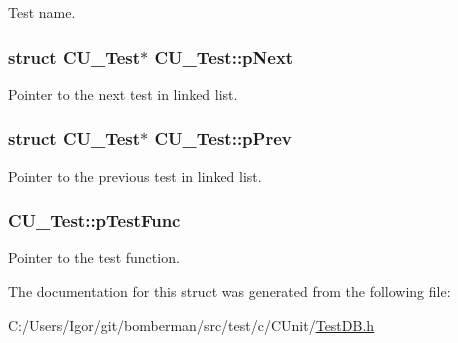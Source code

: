 Test name. 

\hypertarget{struct_c_u___test_abca70319a9ee946094bd7de3e3207141}{
\subsubsection[{p\+Next}]{\setlength{\rightskip}{0pt plus 5cm}struct {\bf C\+U\+\_\+\+Test}$\ast$ C\+U\+\_\+\+Test\+::p\+Next}}\label{struct_c_u___test_abca70319a9ee946094bd7de3e3207141}


Pointer to the next test in linked list. 

\hypertarget{struct_c_u___test_a1b0ae6d72f43397547a0ff3680001c24}{
\subsubsection[{p\+Prev}]{\setlength{\rightskip}{0pt plus 5cm}struct {\bf C\+U\+\_\+\+Test}$\ast$ C\+U\+\_\+\+Test\+::p\+Prev}}\label{struct_c_u___test_a1b0ae6d72f43397547a0ff3680001c24}


Pointer to the previous test in linked list. 

\hypertarget{struct_c_u___test_a9543ec07c51ec70a40cdd845ce3bf55b}{
\subsubsection[{p\+Test\+Func}]{ C\+U\+\_\+\+Test\+::p\+Test\+Func}}\label{struct_c_u___test_a9543ec07c51ec70a40cdd845ce3bf55b}


Pointer to the test function. 



The documentation for this struct was generated from the following file\+:\begin{DoxyCompactItemize}
\item 
C\+:/\+Users/\+Igor/git/bomberman/src/test/c/\+C\+Unit/\hyperlink{_test_d_b_8h}{Test\+D\+B.\+h}\end{DoxyCompactItemize}
